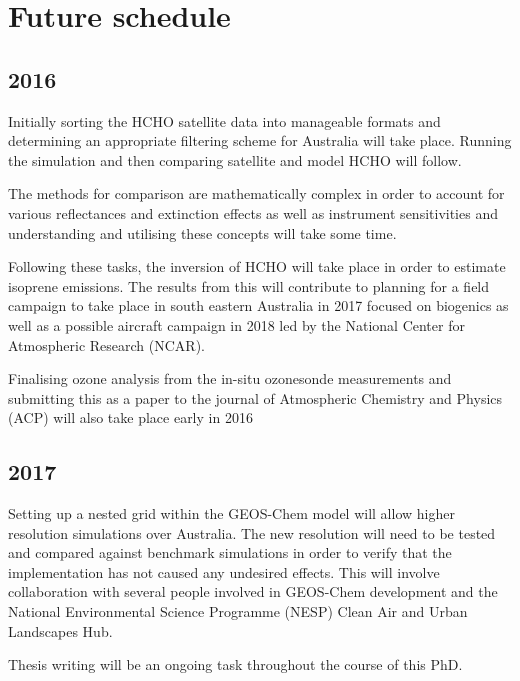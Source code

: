 \section{Future schedule}

\subsection{2016}

Initially sorting the HCHO satellite data into manageable formats and determining an appropriate filtering scheme for Australia will take place.
Running the simulation and then comparing satellite and model HCHO will follow.

The methods for comparison are mathematically complex in order to account for various reflectances and extinction effects as well as instrument sensitivities and understanding and utilising these concepts will take some time.

Following these tasks, the inversion of HCHO will take place in order to estimate isoprene emissions.
The results from this will contribute to planning for a field campaign to take place in south eastern Australia in 2017 focused on biogenics as well as a possible aircraft campaign in 2018 led by the National Center for Atmospheric Research (NCAR).

Finalising ozone analysis from the in-situ ozonesonde measurements and submitting this as a paper to the journal of Atmospheric Chemistry and Physics (ACP) will also take place early in 2016

\subsection{2017}
Setting up a nested grid within the GEOS-Chem model will allow higher resolution simulations over Australia.
The new resolution will need to be tested and compared against benchmark simulations in order to verify that the implementation has not caused any undesired effects.
This will involve collaboration with several people involved in GEOS-Chem development and the National Environmental Science Programme (NESP) Clean Air and Urban Landscapes Hub.

Thesis writing will be an ongoing task throughout the course of this PhD.